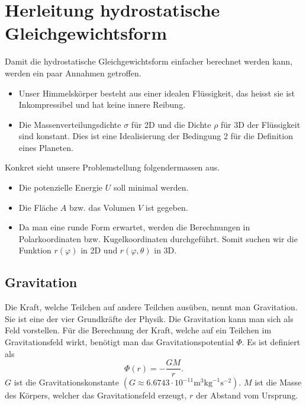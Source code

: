 %
%
%
%
\section{Herleitung hydrostatische Gleichgewichtsform
\label{planet:section:teil1}}
Damit die hydrostatische Gleichgewichtsform einfacher berechnet werden kann, werden ein paar Annahmen getroffen.
\begin{itemize}
	\item Unser Himmelskörper besteht aus einer idealen Flüssigkeit, das heisst sie ist Inkompressibel und hat keine innere Reibung.
	\item Die Massenverteilungsdichte \(\sigma\) für 2D und die Dichte \(\rho\) für 3D der Flüssigkeit sind konstant.
	Dies ist eine Idealisierung der Bedingung 2 für die Definition eines Planeten.
\end{itemize}

Konkret sieht unsere Problemstellung folgendermassen aus.
\begin{itemize}
	\item Die potenzielle Energie \(U\) soll minimal werden.
	\item Die Fläche \(A\) bzw. das Volumen \(V\) ist gegeben.
	\item Da man eine runde Form erwartet, werden die Berechnungen in Polarkoordinaten bzw. Kugelkoordinaten durchgeführt. Somit suchen wir die Funktion \(r(\varphi)\) in 2D und \(r(\varphi,\theta)\) in 3D.
\end{itemize}

\subsection{Gravitation}

Die Kraft, welche Teilchen auf andere Teilchen ausüben, nennt man Gravitation.
Sie ist eine der vier Grundkräfte der Physik.
Die Gravitation kann man sich als Feld vorstellen.
Für die Berechnung der Kraft, welche auf ein Teilchen im Gravitationsfeld wirkt, benötigt man das Gravitationspotential \(\Phi\).
Es ist definiert als
\begin{equation}
	\Phi(r) = -\frac{GM}{r}.
	\label{planet:equ:gravpot}
\end{equation}
\(G\) ist die Gravitationskonstante \((G \approx 6.6743 \cdot 10^{-11} \text{m}^3 \text{kg}^{-1} \text{s}^{-2})\).
\(M\) ist die Masse des Körpers, welcher das Gravitationsfeld erzeugt, \(r\) der Abstand vom Ursprung.


